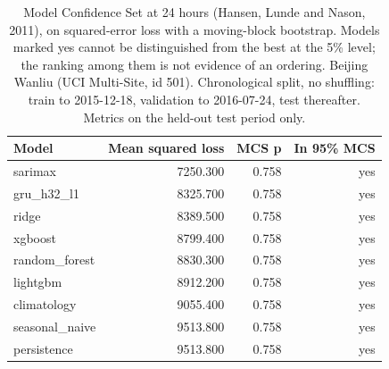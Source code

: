 \begin{table}[htbp]
\caption{Model Confidence Set at 24 hours (Hansen, Lunde and Nason, 2011), on squared-error loss with a moving-block bootstrap. Models marked yes cannot be distinguished from the best at the 5\% level; the ranking among them is not evidence of an ordering. Beijing Wanliu (UCI Multi-Site, id 501). Chronological split, no shuffling: train to 2015-12-18, validation to 2016-07-24, test thereafter. Metrics on the held-out test period only.}
\label{tab:model_confidence_set}
\begin{tabular}{lrrr}
\toprule
Model & Mean squared loss & MCS p & In 95\% MCS \\
\midrule
sarimax & 7250.300 & 0.758 & yes \\
gru\_h32\_l1 & 8325.700 & 0.758 & yes \\
ridge & 8389.500 & 0.758 & yes \\
xgboost & 8799.400 & 0.758 & yes \\
random\_forest & 8830.300 & 0.758 & yes \\
lightgbm & 8912.200 & 0.758 & yes \\
climatology & 9055.400 & 0.758 & yes \\
seasonal\_naive & 9513.800 & 0.758 & yes \\
persistence & 9513.800 & 0.758 & yes \\
\bottomrule
\end{tabular}
\end{table}
